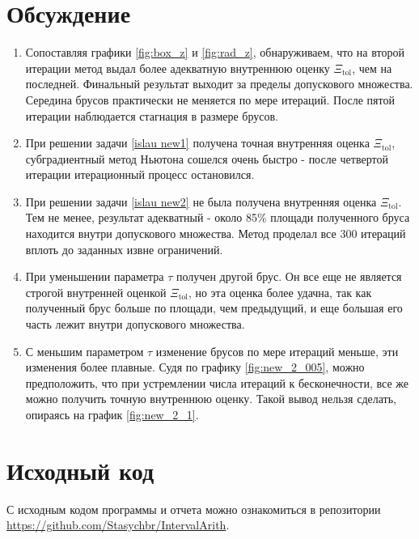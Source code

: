 \documentclass[a4paper]{article}
\begin{document}
\section{Обсуждение}
\begin{enumerate}
    \item Сопоставляя графики \ref{fig:box_z} и \ref{fig:rad_z}, обнаруживаем, что на второй итерации метод выдал более адекватную внутреннюю оценку $\Xi_{\mathrm{tol}}$, чем на последней. Финальный результат выходит за пределы допускового множества. Середина брусов практически не меняется по мере итераций. После пятой итерации наблюдается стагнация в размере брусов.
    \item При решении задачи \ref{islau new1} получена точная внутренняя оценка $\Xi_{\mathrm{tol}}$, субградиентный метод Ньютона сошелся очень быстро - после четвертой итерации итерационный процесс остановился.
    \item При решении задачи \ref{islau new2} не была получена внутренняя оценка $\Xi_{\mathrm{tol}}$. Тем не менее, результат адекватный - около 85\% площади полученного бруса находится внутри допускового множества. Метод проделал все 300 итераций вплоть до заданных извне ограничений.
    \item При уменьшении параметра $\tau$ получен другой брус. Он все еще не является строгой внутренней оценкой $\Xi_{\mathrm{tol}}$, но эта оценка более удачна, так как полученный брус больше по площади, чем предыдущий, и еще большая его часть лежит внутри допускового множества. 
    \item С меньшим параметром $\tau$ изменение брусов по мере итераций меньше, эти изменения более плавные. Судя по графику \ref{fig:new_2_005}, можно предположить, что при устремлении числа итераций к бесконечности, все же можно получить точную внутреннюю оценку. Такой вывод нельзя сделать, опираясь на график \ref{fig:new_2_1}.
\end{enumerate}
\section*{Исходный код}
С исходным кодом программы и отчета можно ознакомиться в репозитории \url{https://github.com/Stasychbr/IntervalArith}.
\end{document}
